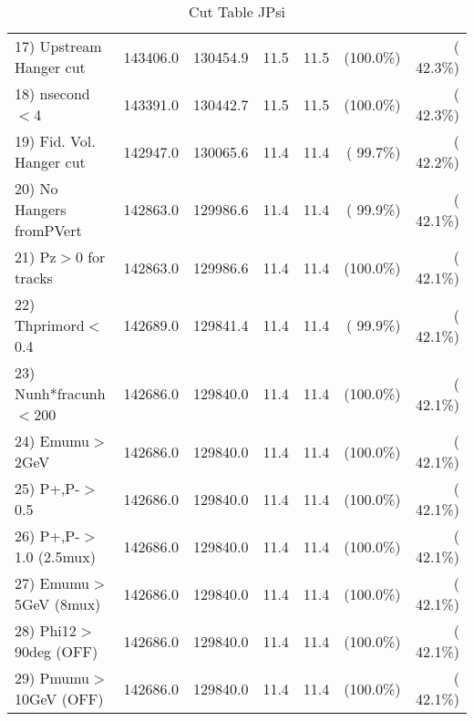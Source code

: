 \begin{table}[h!]
\begin{tabular}{||l||r|r|r|r|r|r||}
 17) Upstream Hanger cut  &     143406.0 &     130454.9 &         11.5 &         11.5 & (100.0\%) & ( 42.3\%) \\
 18) nsecond$<$4          &     143391.0 &     130442.7 &         11.5 &         11.5 & (100.0\%) & ( 42.3\%) \\
 19) Fid. Vol. Hanger cut &     142947.0 &     130065.6 &         11.4 &         11.4 & ( 99.7\%) & ( 42.2\%) \\
 20) No Hangers fromPVert &     142863.0 &     129986.6 &         11.4 &         11.4 & ( 99.9\%) & ( 42.1\%) \\
 21) Pz$>$0 for tracks    &     142863.0 &     129986.6 &         11.4 &         11.4 & (100.0\%) & ( 42.1\%) \\
 22) Thprimord$<$0.4      &     142689.0 &     129841.4 &         11.4 &         11.4 & ( 99.9\%) & ( 42.1\%) \\
 23) Nunh*fracunh$<$200   &     142686.0 &     129840.0 &         11.4 &         11.4 & (100.0\%) & ( 42.1\%) \\
 24) Emumu$>$2GeV         &     142686.0 &     129840.0 &         11.4 &         11.4 & (100.0\%) & ( 42.1\%) \\
 25) P+,P-$>$0.5          &     142686.0 &     129840.0 &         11.4 &         11.4 & (100.0\%) & ( 42.1\%) \\
 26) P+,P-$>$1.0 (2.5mux) &     142686.0 &     129840.0 &         11.4 &         11.4 & (100.0\%) & ( 42.1\%) \\
 27) Emumu$>$5GeV  (8mux) &     142686.0 &     129840.0 &         11.4 &         11.4 & (100.0\%) & ( 42.1\%) \\
 28) Phi12$>$90deg  (OFF) &     142686.0 &     129840.0 &         11.4 &         11.4 & (100.0\%) & ( 42.1\%) \\
 29) Pmumu$>$10GeV  (OFF) &     142686.0 &     129840.0 &         11.4 &         11.4 & (100.0\%) & ( 42.1\%) \\
 \hline
 \hline
 \end{tabular}
 \caption{Cut Table  JPsi     }
 \label{tab-cutcohjpsi-mumu_jpsi}
 \end{table}

